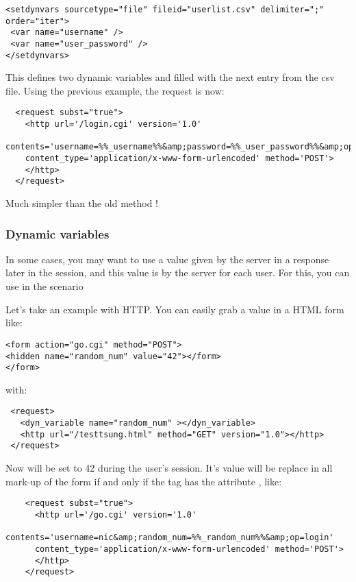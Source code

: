 \documentclass{TSUNG-en}
\begin{document}
\begin{Verbatim}
<setdynvars sourcetype="file" fileid="userlist.csv" delimiter=";" order="iter">
 <var name="username" />
 <var name="user_password" />
</setdynvars>
\end{Verbatim}

This defines two dynamic variables  and
 filled with the next entry from the csv
file. Using the previous example, the request is now:
\begin{Verbatim}
  <request subst="true">
    <http url='/login.cgi' version='1.0'
      contents='username=%%_username%%&amp;password=%%_user_password%%&amp;op=login'
    content_type='application/x-www-form-urlencoded' method='POST'>
    </http>
  </request>
\end{Verbatim}

Much simpler than the old method !

\subsubsection{Dynamic variables}\label{Dynamic variables}

In some cases, you may want to use a value given by the server in a
response later in the session, and this value is  by the server for each user. For this, you can use
 in the scenario

Let's take an example with HTTP. You can easily grab a value in a HTML
form like:
\begin{Verbatim}
<form action="go.cgi" method="POST">
<hidden name="random_num" value="42"></form>
</form>
\end{Verbatim}

with:
\begin{Verbatim}
 <request>
   <dyn_variable name="random_num" ></dyn_variable>
   <http url="/testtsung.html" method="GET" version="1.0"></http>
 </request>
\end{Verbatim}

Now  will be set to 42 during the user's session. It's
value will be replace in all mark-up of the form
 if and only if the  tag has the
attribute , like:

\begin{Verbatim}
    <request subst="true">
      <http url='/go.cgi' version='1.0'
      contents='username=nic&amp;random_num=%%_random_num%%&amp;op=login'
      content_type='application/x-www-form-urlencoded' method='POST'>
      </http>
    </request>
\end{Verbatim}
\end{document}
